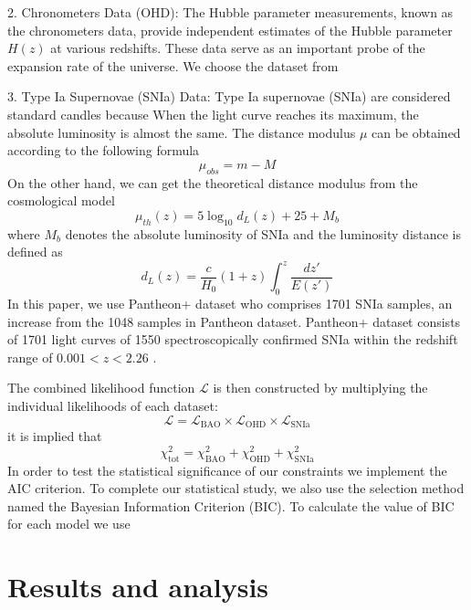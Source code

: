 \documentclass[a4paper,fleqn]{cas-sc}
\begin{document}
2. Chronometers Data (OHD): The Hubble parameter measurements, known as the chronometers data, provide independent estimates of the Hubble parameter \(H(z)\) at various redshifts. These data serve as an important probe of the expansion rate of the universe. We choose the dataset from \cite{Favale_2023}

3. Type Ia Supernovae (SNIa) Data: Type Ia supernovae (SNIa) are considered standard candles because When the light curve reaches its maximum, the absolute luminosity is almost the same. The distance modulus $\mu$ can be obtained according to the following formula
\begin{equation}
    \mu_{obs}=m-M
\end{equation}
On the other hand, we can get the theoretical distance modulus from the cosmological model
\begin{equation}
    \mu_{th}(z)=5\log_{10}d_L(z)+25+M_b
\end{equation}
where $M_b$ denotes the absolute luminosity of SNIa and the luminosity distance is defined as
\begin{equation}
    d_L(z)=\frac{c}{H_0}(1+z)\int_0^z \frac{dz'}{E(z')}
\end{equation}
In this paper, we use Pantheon+ dataset who comprises 1701 SNIa samples, an increase from the 1048 samples in Pantheon dataset. Pantheon+ dataset consists of 1701 light curves of 1550 spectroscopically confirmed SNIa within the redshift range of $0.001 < z < 2.26$ \cite{Scolnic_2022,Brout_2022}.

The combined likelihood function \(\mathcal{L}\) is then constructed by multiplying the individual likelihoods of each dataset:
\begin{equation}
\mathcal{L} = \mathcal{L}_{\text{BAO}} \times \mathcal{L}_{\text{OHD}} \times \mathcal{L}_{\text{SNIa}}
\end{equation}
it is implied that
\begin{equation}
    \chi^2_\text{tot}=\chi^2_{\text{BAO}}+\chi^2_{\text{OHD}} +\chi^2_{\text{SNIa}}
\end{equation}
In order to test the statistical significance of our constraints we implement the AIC criterion.
To complete our statistical study, we also use the selection method named the Bayesian Information Criterion (BIC). To calculate the value of BIC for each model we use

\section{Results and analysis}\label{sec:result}
\end{document}
